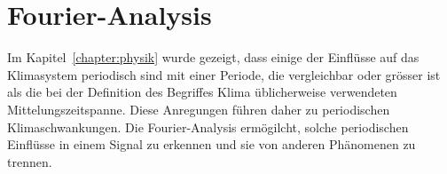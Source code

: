 %
%
%
\chapter{Fourier-Analysis\label{chapter:fourier}}
Im Kapitel~\ref{chapter:physik} wurde gezeigt, dass einige der Einflüsse
auf das Klimasystem periodisch sind mit einer Periode, die vergleichbar
oder grösser ist als die bei der Definition des Begriffes Klima üblicherweise
verwendeten Mittelungszeitspanne.
Diese Anregungen führen daher zu periodischen Klimaschwankungen.
Die Fourier-Analysis ermögilcht, solche periodischen Einflüsse in
einem Signal zu erkennen und sie von anderen Phänomenen zu trennen.






